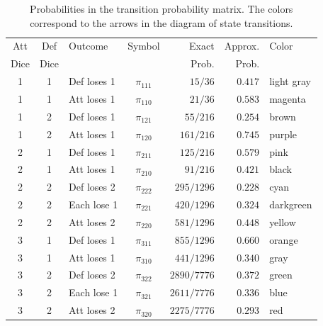 \documentclass[12pt]{article}
\begin{document}
\begin{table}
    \centering
    \begin{tabular}{cclcrrl}
        Att    & Def      & Outcome     & Symbol      & Exact       & Approx. & Color      \\ 
        Dice   & Dice     &             &             & Prob.       & Prob.   &            \\ 
        \hline
        1      & 1        & Def loses 1 & $\pi_{111}$ & $15/36$     & $0.417$ & light gray \\ %
         
        1      & 1        & Att loses 1 & $\pi_{110}$ & $21/36$     & $0.583$ & magenta    \\ %
         
        \hline
        1      & 2        & Def loses 1 & $\pi_{121}$ & $55/216$    & $0.254$ & brown      \\ %
         
        1      & 2        & Att loses 1 & $\pi_{120}$ & $161/216$   & $0.745$ & purple     \\ %
         
        \hline
        2      & 1        & Def loses 1 & $\pi_{211}$ & $125/216$   & $0.579$ & pink       \\ %
         
        2      & 1        & Att loses 1 & $\pi_{210}$ & $91/216$    & $0.421$ & black      \\ %
         
        \hline
        2      & 2        & Def loses 2 & $\pi_{222}$ & $295/1296$  & $0.228$ & cyan       \\ 
        2      & 2        & Each lose 1 & $\pi_{221}$ & $420/1296$  & $0.324$ & darkgreen  \\ 
        2      & 2        & Att loses 2 & $\pi_{220}$ & $581/1296$  & $0.448$ & yellow     \\ 
        \hline
        3      & 1        & Def loses 1 & $\pi_{311}$ & $855/1296$  & $0.660$ & orange     \\ %
         
        3      & 1        & Att loses 1 & $\pi_{310}$ & $441/1296$  & $0.340$ & gray       \\ %
         
        \hline
        3      & 2        & Def loses 2 & $\pi_{322}$ & $2890/7776$ & $0.372$ & green      \\ 
        3      & 2        & Each lose 1 & $\pi_{321}$ & $2611/7776$ & $0.336$ & blue       \\ 
        3      & 2        & Att loses 2 & $\pi_{320}$ & $2275/7776$ & $0.293$ & red        \\ 
    \end{tabular}
    \caption{Probabilities in the transition probability matrix.  The
    colors correspond to the arrows in the diagram of state transitions.}
    \label{tab:games:risktransprobs}
\end{table}
\end{document}

